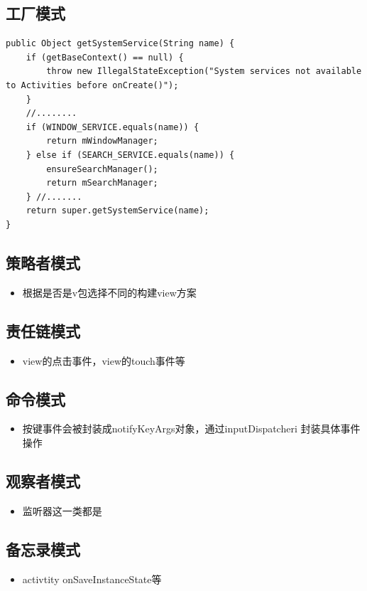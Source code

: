 \documentclass[9pt, b5paper]{article}
\begin{document}
\subsection{工厂模式}
\label{sec-15-14}
\begin{verbatim}
public Object getSystemService(String name) { 
    if (getBaseContext() == null) { 
        throw new IllegalStateException("System services not available to Activities before onCreate()"); 
    }
    //........ 
    if (WINDOW_SERVICE.equals(name)) { 
        return mWindowManager; 
    } else if (SEARCH_SERVICE.equals(name)) { 
        ensureSearchManager(); 
        return mSearchManager; 
    } //....... 
    return super.getSystemService(name);
}
\end{verbatim}
\subsection{策略者模式}
\label{sec-15-15}
\begin{itemize}
\item 根据是否是v包选择不同的构建view方案
\end{itemize}
\subsection{责任链模式}
\label{sec-15-16}
\begin{itemize}
\item view的点击事件，view的touch事件等
\end{itemize}
\subsection{命令模式}
\label{sec-15-17}
\begin{itemize}
\item 按键事件会被封装成notifyKeyArgs对象，通过inputDispatcheri 封装具体事件操作
\end{itemize}
\subsection{观察者模式}
\label{sec-15-18}
\begin{itemize}
\item 监听器这一类都是
\end{itemize}
\subsection{备忘录模式}
\label{sec-15-19}
\begin{itemize}
\item activtity onSaveInstanceState等
\end{itemize}
\end{document}
